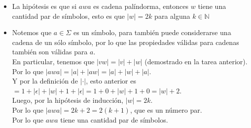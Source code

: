 \documentclass{article}
\begin{document}
\begin{enumerate}
{\begin{enumerate}
{\begin{itemize}
{                            Entonces $|w| = 0 = 2\cdot 0$.\\
                            Por lo que $w = \epsilon$ tiene una cantidad par de 
                            símbolos.
                        }
                        \item {
                            La hipótesis es que si $awa$ es cadena palíndorma, 
                            entonces $w$ tiene una cantidad par de símbolos, 
                            esto es que $|w| = 2k$ para alguna $k \in \mathbb{N}$
                        }
                        \item {
                            Notemos que $a \in \Sigma$ es un símbolo, para 
                            también puede considerarse una cadena de un sólo 
                            símbolo, por lo que las propiedades válidas para 
                            cadenas también son válidas para $a$.\\
                            En particular, tenemos que $|vw| = |v| + |w|$ 
                            (demostrado en la tarea anterior).\\
                            Por lo que $|awa| = |a| + |aw| = |a| + |w| + |a| $.\\
                            Y por la definición de $|\cdot|$, esto anterior es
                            $= 1 + |\epsilon| + |w| + 1 + |\epsilon| 
                            = 1 + 0 + |w| + 1 + 0 = |w| + 2$.\\
                            Luego, por la hipótesis de inducción, $|w| = 2k$.\\
                            Por lo que $|awa| = 2k + 2 = 2 (k+1)$, que es un 
                            número par.\\
                            Por lo que $awa$ tiene una cantidad par de símbolos.                        }
                    \end{itemize}
                }
                

\end{enumerate}}
\end{enumerate}
\end{document}
